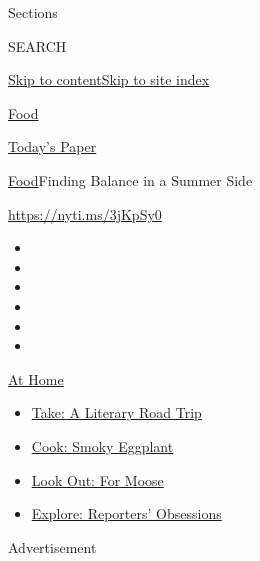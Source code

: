 Sections

SEARCH

\protect\hyperlink{site-content}{Skip to
content}\protect\hyperlink{site-index}{Skip to site index}

\href{https://www.nytimes.com/section/food}{Food}

\href{https://myaccount.nytimes.com/auth/login?response_type=cookie\&client_id=vi}{}

\href{https://www.nytimes.com/section/todayspaper}{Today's Paper}

\href{/section/food}{Food}\textbar{}Finding Balance in a Summer Side

\url{https://nyti.ms/3jKpSy0}

\begin{itemize}
\item
\item
\item
\item
\item
\item
\end{itemize}

\href{https://www.nytimes.com/spotlight/at-home?action=click\&pgtype=Article\&state=default\&region=TOP_BANNER\&context=at_home_menu}{At
Home}

\begin{itemize}
\tightlist
\item
  \href{https://www.nytimes.com/2020/07/28/books/time-for-a-literary-road-trip.html?action=click\&pgtype=Article\&state=default\&region=TOP_BANNER\&context=at_home_menu}{Take:
  A Literary Road Trip}
\item
  \href{https://www.nytimes.com/2020/07/29/magazine/bored-with-your-home-cooking-some-smoky-eggplant-will-fix-that.html?action=click\&pgtype=Article\&state=default\&region=TOP_BANNER\&context=at_home_menu}{Cook:
  Smoky Eggplant}
\item
  \href{https://www.nytimes.com/2020/07/27/travel/moose-michigan-isle-royale.html?action=click\&pgtype=Article\&state=default\&region=TOP_BANNER\&context=at_home_menu}{Look
  Out: For Moose}
\item
  \href{https://www.nytimes.com/interactive/2020/at-home/even-more-reporters-editors-diaries-lists-recommendations.html?action=click\&pgtype=Article\&state=default\&region=TOP_BANNER\&context=at_home_menu}{Explore:
  Reporters' Obsessions}
\end{itemize}

Advertisement

